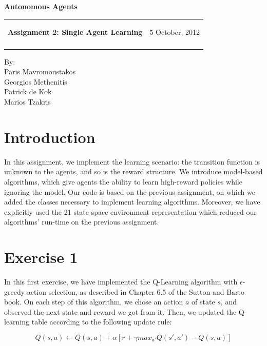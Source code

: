 \documentclass[a4paper,11pt]{article}
\makeatletter
\newcommand{\resheading}[1]{{\large \colorbox{mygrey}{\begin{minipage}{\textwidth}{\textbf{#1 \vphantom{p\^{E}}}}\end{minipage}}}}
\newcommand{\mywebheader}{
  \begin{tabular}{@{}p{5in}p{4in}}
  {\resheading{Assignment 2: Single Agent Learning}} & {\Large 5 October, 2012}\\\vspace{0.2cm}
  \end{tabular}}
\makeatother
\begin{document}
\begin{center}
{\LARGE \textbf{Autonomous Agents}}\\ [1em]
\end{center}
\mywebheader

\begin{center}
{\Large By:} \\ \vspace{0.1cm}
{\Large Paris Mavromoustakos} \\  \vspace{0.1cm}
{\Large Georgios Methenitis} \\ \vspace{0.1cm}
{\Large Patrick de Kok} \\ \vspace{0.1cm}
{\Large Marios Tzakris}
\end{center}




\section*{Introduction}

In this assignment, we implement the learning scenario: the transition function is unknown to the agents, and so is the reward structure. We introduce model-based algorithms, which give agents the ability to learn high-reward policies while ignoring the model. Our code is based on the previous assignment, on which we added the classes necessary to implement learning algorithms. Moreover, we have explicitly used the 21 state-space environment representation which reduced our algorithms' run-time on the previous assignment.


\section*{Exercise 1}

In this first exercise, we have implemented the Q-Learning algorithm with $\epsilon$-greedy action selection, as described  in Chapter 6.5 of the Sutton and Barto book. On each step of this algorithm, we chose an action $a$ of state $s$, and observed the next state and reward we got from it. Then, we updated the Q-learning table according to the following update rule:

\[Q(s,a) \leftarrow  Q(s,a) + \alpha \left[ r + \gamma  max_{a'} Q(s',a') - Q(s,a)\right]
\]
\end{document}
